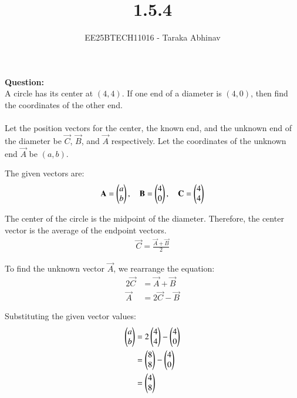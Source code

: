 \documentclass[journal]{IEEEtran}
\begin{document}
	
	
	\vspace{3cm}
	
	\title{1.5.4}
	\author{EE25BTECH11016 - Taraka Abhinav}
	\maketitle
	{\let\newpage\relax\maketitle}
	
	\setlength{\intextsep}{10pt} %

\textbf{Question:}\\
A circle has its center at $(4,4)$. If one end of a diameter is $(4,0)$, then find the coordinates of the other end.\\
\solution\\
Let the position vectors for the center, the known end, and the unknown end of the diameter be $\vec{C}$, $\vec{B}$, and $\vec{A}$ respectively. Let the coordinates of the unknown end $\vec{A}$ be $(a,b)$.

The given vectors are:
\begin{align}
\mathbf{A} = \begin{pmatrix}a\\b\end{pmatrix}, \quad \mathbf{B} = \begin{pmatrix}4\\0\end{pmatrix}, \quad \mathbf{C} = \begin{pmatrix}4\\4\end{pmatrix}
\end{align}

The center of the circle is the midpoint of the diameter. Therefore, the center vector is the average of the endpoint vectors.
\begin{align}
\vec{C} = \frac{\vec{A}+\vec{B}}{2}
\end{align}

To find the unknown vector $\vec{A}$, we rearrange the equation:
\begin{align}
2\vec{C} &= \vec{A} + \vec{B} \\
\vec{A} &= 2\vec{C} - \vec{B}
\end{align}

Substituting the given vector values:
\begin{align}
\begin{pmatrix}a\\b\end{pmatrix} &= 2\begin{pmatrix}4\\4\end{pmatrix} - \begin{pmatrix}4\\0\end{pmatrix} \nonumber \\
&= \begin{pmatrix}8\\8\end{pmatrix} - \begin{pmatrix}4\\0\end{pmatrix} \\
&= \begin{pmatrix}4\\8\end{pmatrix}
\end{align}
\end{document}
